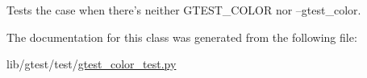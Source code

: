 \begin{DoxyVerb}Tests the case when there's neither GTEST_COLOR nor --gtest_color.\end{DoxyVerb}
 

The documentation for this class was generated from the following file\-:\begin{DoxyCompactItemize}
\item 
lib/gtest/test/\hyperlink{gtest__color__test_8py}{gtest\-\_\-color\-\_\-test.\-py}\end{DoxyCompactItemize}
